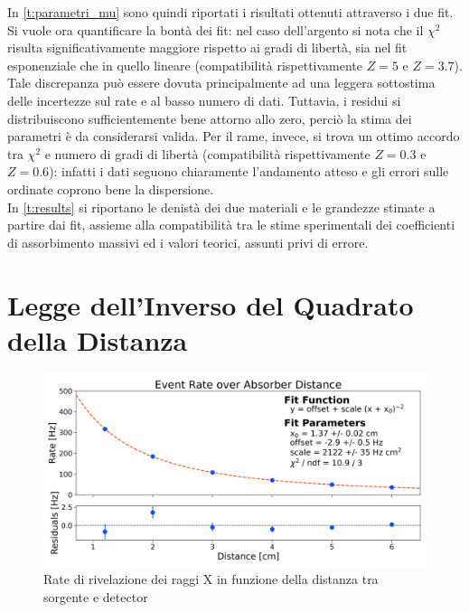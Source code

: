 \documentclass[twocolumn,10pt]{asme2ej}
\begin{document}
In \autoref{t:parametri_mu} sono quindi riportati i risultati ottenuti attraverso i due fit. Si vuole ora quantificare
la bontà dei fit: nel caso dell'argento si nota che il $\chi^2$ risulta significativamente maggiore rispetto ai gradi di
libertà, sia nel fit esponenziale che in quello lineare (compatibilità rispettivamente $Z=5$ e $Z=3.7$). Tale
discrepanza può essere dovuta principalmente ad una leggera sottostima delle incertezze sul rate e al basso numero di
dati. Tuttavia, i residui si distribuiscono sufficientemente bene attorno allo zero, perciò la stima dei parametri è da
considerarsi valida. Per il rame, invece, si trova un ottimo accordo tra $\chi^2$ e numero di gradi di libertà
(compatibilità rispettivamente $Z=0.3$ e $Z=0.6$): infatti i dati seguono chiaramente l'andamento atteso e gli errori
sulle ordinate coprono bene la dispersione. \\
In \autoref{t:results} si riportano le denistà dei due materiali e le grandezze stimate a partire dai fit, assieme alla
compatibilità tra le stime sperimentali dei coefficienti di assorbimento massivi ed i valori teorici, assunti privi di
errore. 





\vspace{-10pt}
\section{Legge dell'Inverso del Quadrato della Distanza}\label{s:distanza}

\begin{figure}
    \centering
    \includegraphics[width=\linewidth]{../Plots/distance_small.png}
    \caption{Rate di rivelazione dei raggi X in funzione della distanza tra sorgente e detector}
    \label{i:distance}
    \vspace{-10pt}
\end{figure}
\end{document}
